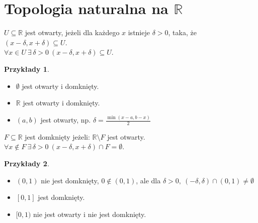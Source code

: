 \documentclass[twoside,10pt]{article}
\theoremstyle{definition}
\theoremstyle{definition}
\theoremstyle{definition}
\theoremstyle{definition}
\theoremstyle{remark}
\theoremstyle{definition}
\theoremstyle{definition}
\theoremstyle{definition}
\theoremstyle{definition}
\theoremstyle{definition}
\newtheorem*{przy}{Przykłady}
\theoremstyle{definition}
\begin{document}
\section{Topologia naturalna na $\mathbb{R}$ }
\begin{df}
    $ U \subseteq \mathbb{R}$ jest otwarty, jeżeli dla każdego $x$ istnieje $\delta > 0$, taka, że $(x - \delta, x+\delta) \subseteq U$. \\
    $ \forall x \in U \ \exists \, \delta > 0 \ (x-\delta,x+\delta) \subseteq U $.
\end{df}
\begin{minipage}[c]{0.5\linewidth}
\begin{przy} \hfill 
    \begin{itemize} 
        \item $\emptyset$ jest otwarty i domknięty.
        \item $\mathbb{R}$ jest otwarty i domknięty.
        \item $(a,b)$ jest otwarty, np. $\delta = \frac{\min(x-a,b-x)}{2}$
    \end{itemize} 
\end{przy} 
\end{minipage}
\begin{minipage}[b]{0.4\linewidth}
\end{minipage} 
\begin{df} 
    $ F \subseteq \mathbb{R} $ jest domknięty jeżeli: $\mathbb{R} \setminus F$ jest otwarty. 
    $ \forall x \notin F \ \exists \, \delta > 0 \ ( x - \delta, x + \delta ) \cap F = \emptyset $.
\end{df} 
\begin{przy} \hfill
    \begin{itemize} 
        \item $(0,1)$ nie jest domknięty, $0 \notin (0,1)$, ale dla $\delta > 0, \ (-\delta,\delta) 
                \cap (0,1) \neq \emptyset$
        \item $[0,1]$ jest domknięty.
        \item $[0,1)$ nie jest otwarty i nie jest domknięty.
    \end{itemize} 
\end{przy}
\end{document}
